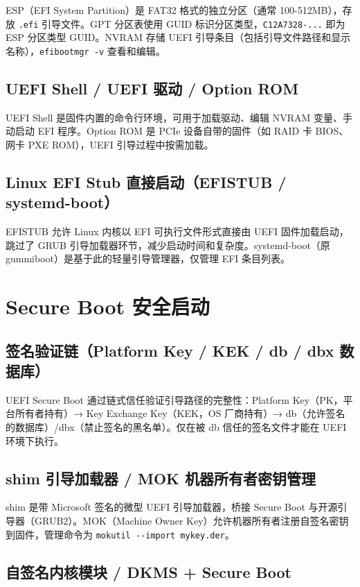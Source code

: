 \documentclass[12pt,UTF8]{ctexbook}
\begin{document}
ESP（EFI System Partition）是 FAT32 格式的独立分区（通常 100-512MB），存放 \verb|.efi| 引导文件。GPT 分区表使用 GUID 标识分区类型，\verb|C12A7328-...| 即为 ESP 分区类型 GUID。NVRAM 存储 UEFI 引导条目（包括引导文件路径和显示名称），\verb|efibootmgr -v| 查看和编辑。

    \subsection{UEFI Shell / UEFI 驱动 / Option ROM}

UEFI Shell 是固件内置的命令行环境，可用于加载驱动、编辑 NVRAM 变量、手动启动 EFI 程序。Option ROM 是 PCIe 设备自带的固件（如 RAID 卡 BIOS、网卡 PXE ROM），UEFI 引导过程中按需加载。

    \subsection{Linux EFI Stub 直接启动（EFISTUB / systemd-boot）}

EFISTUB 允许 Linux 内核以 EFI 可执行文件形式直接由 UEFI 固件加载启动，跳过了 GRUB 引导加载器环节，减少启动时间和复杂度。systemd-boot（原 gummiboot）是基于此的轻量引导管理器，仅管理 EFI 条目列表。

  \section{Secure Boot 安全启动}
    \subsection{签名验证链（Platform Key / KEK / db / dbx 数据库）}

UEFI Secure Boot 通过链式信任验证引导路径的完整性：Platform Key（PK，平台所有者持有）→ Key Exchange Key（KEK，OS 厂商持有）→ db（允许签名的数据库）/dbx（禁止签名的黑名单）。仅在被 db 信任的签名文件才能在 UEFI 环境下执行。

    \subsection{shim 引导加载器 / MOK 机器所有者密钥管理}

shim 是带 Microsoft 签名的微型 UEFI 引导加载器，桥接 Secure Boot 与开源引导器（GRUB2）。MOK（Machine Owner Key）允许机器所有者注册自签名密钥到固件，管理命令为 \verb|mokutil --import mykey.der|。

    \subsection{自签名内核模块 / DKMS + Secure Boot}
\end{document}
